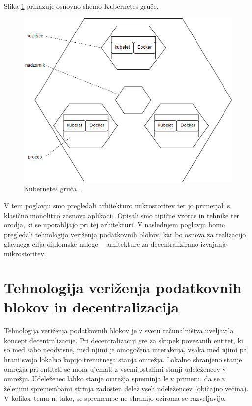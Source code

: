 \documentclass[a4paper, 12pt]{book}
\begin{document}
Slika \ref{kubernetes_cluster} prikazuje osnovno shemo Kubernetes gruče.

\begin{figure}[h]
	\includegraphics[width=1.0\textwidth]{slike/kubernetes_cluster.png}
	\caption{Kubernetes gruča \cite{kubernetesTutorial}.}
	\label{kubernetes_cluster}
\end{figure}

V tem poglavju smo pregledali arhitekturo mikrostoritev ter jo primerjali s klasično monolitno zasnovo aplikacij.
Opisali smo tipične vzorce in tehnike ter orodja, ki se uporabljajo pri tej arhitekturi.
V naslednjem poglavju bomo pregledali tehnologijo veriženja podatkovnih blokov, kar bo osnova za realizacijo glavnega cilja diplomske naloge -- arhitekture za decentralizirano izvajanje mikrostoritev.

\chapter{Tehnologija veriženja podatkovnih blokov in decentralizacija}
\label{ch2}

Tehnologija veriženja podatkovnih blokov je v svetu računalništva uveljavila koncept decentralizacije.
Pri decentralizaciji gre za skupek povezanih entitet, ki so med sabo neodvisne, med njimi je omogočena interakcija, vsaka med njimi pa hrani svojo lokalno kopijo trenutnega stanja omrežja.
Lokalno shranjeno stanje omrežja pri entiteti se mora ujemati z vsemi ostalimi stanji udeležencev v omrežju.
Udeleženec lahko stanje omrežja spreminja le v primeru, da se z želenimi spremembami strinja zadosten delež vseh udeležencev (običajno večina).
V kolikor temu ni tako, se spremembe ne shranijo oziroma se razveljavijo.
\end{document}
